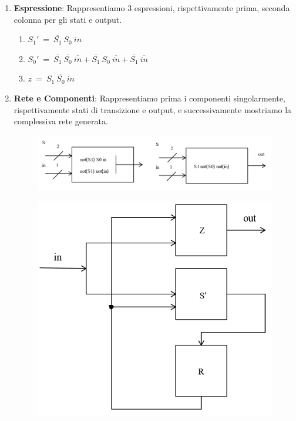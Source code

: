 \documentclass{article}
\begin{document}
\begin{enumerate}
     \item \textbf{Espressione}: Rappresentiamo $3$ espressioni, rispettivamente prima, seconda colonna per gli stati e output.

    \begin{enumerate}
        \item $S_{1}' \: = \: \overline{S_{1}}\:S_{0}\:in $
        \item $S_{0}' \: = \: \overline{S_{1}}\:\overline{S_{0}}\:\overline{in} + \overline{S_{1}}\:S_{0}\:\overline{in} + \overline{S_{1}}\:\overline{in}$
        \item $ z \: = \: S_{1} \: \overline{S_{0}} \: in $
    \end{enumerate}

    \item \textbf{Rete e Componenti}: Rappresentiamo prima i componenti singolarmente, rispettivamente stati di transizione e output, e successivamente mostriamo la complessiva rete generata.

    \begin{figure}[htbp]
        \includegraphics[scale=0.5]{img/rete1_automa1.png}
        \centering
    \end{figure}

    \begin{figure}[htbp]
        \includegraphics[scale=0.5]{img/rete2_automa1.png}
        \centering
    \end{figure}
    
\end{enumerate}
\end{document}
